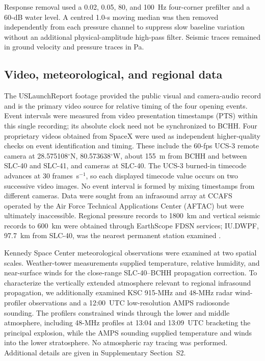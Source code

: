 \documentclass[]{seismica}
\begin{document}
Response removal used a 0.02, 0.05, 80, and 100~Hz four-corner prefilter and a
60-dB water level. A centred 1.0-s moving median was then removed independently
from each pressure channel to suppress slow baseline variation without an
additional physical-amplitude high-pass filter. Seismic traces remained in
ground velocity and pressure traces in Pa.

\subsection{Video, meteorological, and regional data}

The USLaunchReport footage \citep{uslaunchreport_amos6_video_2016} provided the public visual and camera-audio record and is the primary video source for relative timing of the four opening events. Event intervals were measured from video presentation timestamps (PTS) within this single recording; its absolute clock need not be synchronized to BCHH. Four proprietary videos obtained from SpaceX were used as independent higher-quality checks on event identification and timing. These include the 60-fps UCS-3 remote camera at 28.575108$^\circ$N, 80.573638$^\circ$W, about 155~m from BCHH and between SLC-40 and SLC-41, and cameras at SLC-40. The UCS-3 burned-in timecode advances at 30 frames~s$^{-1}$, so each displayed timecode value occurs on two successive video images. No event interval is formed by mixing timestamps from different cameras. Data were sought from an infrasound array at CCAFS operated by the Air Force Technical Applications Center (AFTAC) but were ultimately inaccessible. Regional pressure records to 1800~km
and vertical seismic records to 600~km were obtained through EarthScope FDSN
services; IU.DWPF, 97.7~km from SLC-40, was the nearest permanent station
examined \citep{asl_gsn_iu_1988}.

Kennedy Space Center meteorological observations were examined at two spatial scales. Weather-tower measurements supplied temperature, relative humidity, and near-surface winds for the close-range SLC-40--BCHH propagation correction. To characterize the vertically extended atmosphere relevant to regional infrasound propagation, we additionally examined KSC 915-MHz and 48-MHz radar wind-profiler observations and a 12:00~UTC low-resolution AMPS radiosonde sounding. The profilers constrained winds through the lower and middle atmosphere, including 48-MHz profiles at 13:04 and 13:09~UTC bracketing the principal explosion, while the AMPS sounding supplied temperature and winds into the lower stratosphere. No atmospheric ray tracing was performed. Additional details are given in Supplementary Section~S2.
\end{document}
